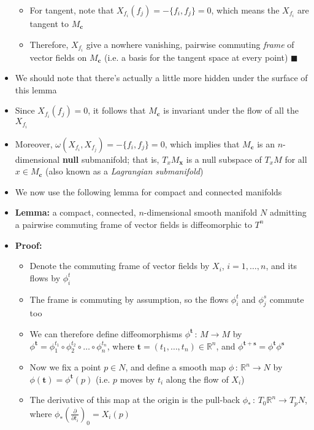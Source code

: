 \documentclass[12pt,a4paper]{article}
\numberwithin{equation}{section}
\begin{document}
\begin{itemize}
\begin{itemize}
			\item For tangent, note that $X_{f_{i}}(f_{j})=-\{f_{i},f_{j}\}=0$, which means the $X_{f_{i}}$ are tangent to $M_{\mathbf{c}}$
			\item Therefore, $X_{f_{i}}$ give a nowhere vanishing, pairwise commuting \textit{frame} of vector fields on $M_{\mathbf{c}}$ (i.e. a basis for the tangent space at every point) $\blacksquare$
		\end{itemize}
		\item We should note that there's actually a little more hidden under the surface of this lemma
		\item Since $X_{f_{i}}(f_{j})=0$, it follows that $M_{\mathbf{c}}$ is invariant under the flow of all the $X_{f_{i}}$
		\item Moreover, $\omega(X_{f_{i}},X_{f_{j}})=-\{f_{i},f_{j}\}=0$, which implies that $M_{\mathbf{c}}$ is an $n$-dimensional \textbf{null} submanifold; that is, $T_{x}M_{\mathbf{x}}$ is a null subspace of $T_{x}M$ for all $x\in M_{\mathbf{c}}$ (also known as a \textit{Lagrangian submanifold})
		\item We now use the following lemma for compact and connected manifolds
		\item \textbf{Lemma:} a compact, connected, $n$-dimensional smooth manifold $N$ admitting a pairwise commuting frame of vector fields is diffeomorphic to $T^{n}$
		\item \textbf{Proof:}
		\begin{itemize}
			\item Denote the commuting frame of vector fields by $X_{i}$, $i=1,\ldots,n$, and its flows by $\phi_{i}^{t}$
			\item The frame is commuting by assumption, so the flows $\phi_{i}^{t}$ and $\phi_{j}^{s}$ commute too
			\item We can therefore define diffeomorphisms $\phi^{\mathbf{t}}\,:\,M\to M$ by $\phi^{\mathbf{t}}=\phi_{1}^{t_{1}}\circ\phi_{2}^{t_{2}}\circ\ldots\circ \phi_{n}^{t_{n}}$, where $\mathbf{t}=(t_{1},\ldots,t_{n})\in\mathbb{R}^{n}$, and $\phi^{\mathbf{t}+\mathbf{s}}=\phi^{\mathbf{t}}\phi^{\mathbf{s}}$
			\item Now we fix a point $p\in N$, and define a smooth map $\phi\,:\,\mathbb{R}^{n}\to N$ by $\phi(\mathbf{t})=\phi^{\mathbf{t}}(p)$ (i.e. $p$ moves by $t_{i}$ along the flow of $X_{i}$)
			\item The derivative of this map at the origin is the pull-back $\phi_{*}\,:\,T_{0}\mathbb{R}^{n}\to T_{p}N$, where $\phi_{*}\left(\frac{\partial}{\partial t_{i}}\right)_{0}=X_{i}(p)$

\end{itemize}
\end{itemize}
\end{document}
